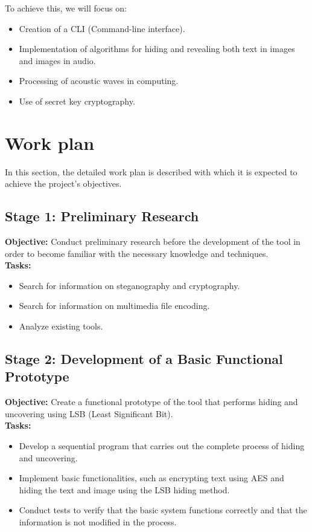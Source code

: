 To achieve this, we will focus on: 

\begin{itemize}
    \item Creation of a CLI (Command-line interface).
    \item Implementation of algorithms for hiding and revealing both text in images and images in audio.
    \item Processing of acoustic waves in computing.
    \item Use of secret key cryptography.
\end{itemize}

\section{Work plan}

In this section, the detailed work plan is described with which it is expected to achieve the project's objectives.

\subsection{Stage 1: Preliminary Research }

\textbf{Objective:} Conduct preliminary research before the development of the tool in order to become familiar with the necessary knowledge and techniques.\\

\textbf{Tasks:}
\begin{itemize}
    \item Search for information on steganography and cryptography. 
    \item Search for information on multimedia file encoding.  
    \item Analyze existing tools.
\end{itemize}



\subsection{Stage 2: Development of a Basic Functional Prototype}
\textbf{Objective:} Create a functional prototype of the tool that performs hiding and uncovering using LSB (Least Significant Bit).\\

\textbf{Tasks:}
\begin{itemize}
    \item Develop a sequential program that carries out the complete process of hiding and uncovering.
    \item Implement basic functionalities, such as encrypting text using AES and hiding the text and image using the LSB hiding method. 
    \item Conduct tests to verify that the basic system functions correctly and that the information is not modified in the process.
\end{itemize}



